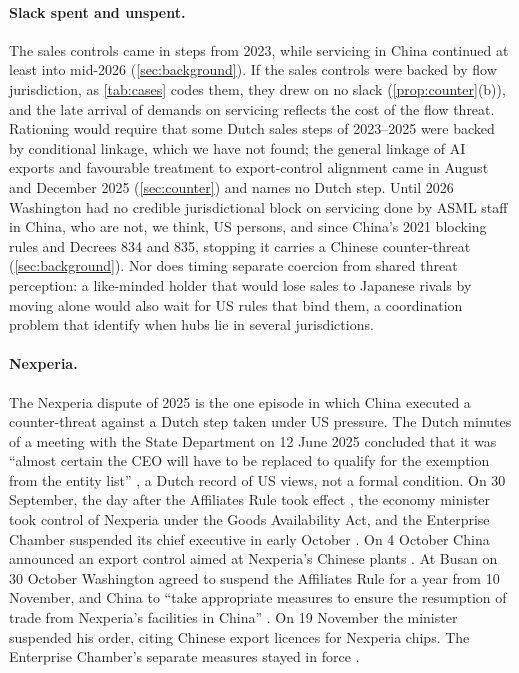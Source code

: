 \paragraph{Slack spent and unspent.} The sales controls came in steps from 2023, while servicing in China continued at least into mid-2026 (\cref{sec:background}). If the sales controls were backed by flow jurisdiction, as \cref{tab:cases} codes them, they drew on no slack (\cref{prop:counter}(b)), and the late arrival of demands on servicing reflects the cost of the flow threat. Rationing would require that some Dutch sales steps of 2023--2025 were backed by conditional linkage, which we have not found; the general linkage of AI exports and favourable treatment to export-control alignment came in August and December 2025 (\cref{sec:counter}) and names no Dutch step. Until 2026 Washington had no credible jurisdictional block on servicing done by ASML staff in China, who are not, we think, US persons, and since China's 2021 blocking rules and Decrees 834 and 835, stopping it carries a Chinese counter-threat (\cref{sec:background}). Nor does timing separate coercion from shared threat perception: a like-minded holder that would lose sales to Japanese rivals by moving alone would also wait for US rules that bind them, a coordination problem that \citet{farrell2019weaponized} identify when hubs lie in several jurisdictions.

\paragraph{Nexperia.} The Nexperia dispute of 2025 is the one episode in which China executed a counter-threat against a Dutch step taken under US pressure. The Dutch minutes of a meeting with the State Department on 12 June 2025 concluded that it was ``almost certain the CEO will have to be replaced to qualify for the exemption from the entity list'' \citep[paras.~2.19--2.20; our translation]{gerechtshof2025nexperia}, a Dutch record of US views, not a formal condition. On 30 September, the day after the Affiliates Rule took effect \citep{bis2025affiliatesrule}, the economy minister took control of Nexperia under the Goods Availability Act, and the Enterprise Chamber suspended its chief executive in early October \citep{kst32637720, gerechtshof2025nexperia}. On 4 October China announced an export control aimed at Nexperia's Chinese plants \citep{kst32637720}. At Busan on 30 October Washington agreed to suspend the Affiliates Rule for a year from 10 November, and China to ``take appropriate measures to ensure the resumption of trade from Nexperia's facilities in China'' \citep{fmprc2025busan, whitehouse2025busan, bis2025affiliates}. On 19 November the minister suspended his order, citing Chinese export licences for Nexperia chips. The Enterprise Chamber's separate measures stayed in force \citep{kst32637_717}.

